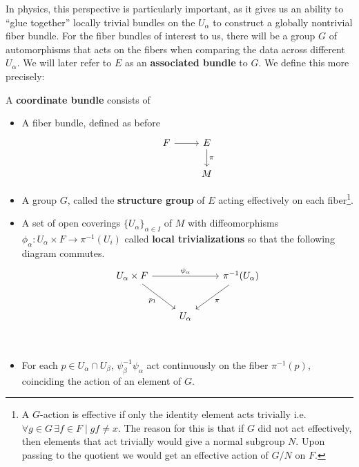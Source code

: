 	In physics, this perspective is particularly important, as it gives us an ability to ``glue together'' locally trivial bundles on the $U_\alpha$ to construct a globally nontrivial fiber bundle. For the fiber bundles of interest to us, there will be a group $G$ of automorphisms that acts on the fibers when comparing the data across different $U_\alpha$. We will later refer to $E$ as an \textbf{associated bundle} to $G$.
	We define this more precisely:
	\begin{defn}
		A \textbf{coordinate bundle} consists of 
		\begin{itemize}
			\item A fiber bundle, defined as before
			\[
			\begin{tikzcd}
				F \arrow[r] & E  \arrow[d,"\pi"] \\ 
				& M
			\end{tikzcd}
			\]
			\item A group $G$, called the \textbf{structure group} of $E$ acting effectively on each fiber\footnote{A $G$-action is effective if only the identity element acts trivially i.e. $\forall g\in G \, \exists f \in F \mid gf \neq x$. The reason for this is that if $G$ did not act effectively, then elements that act trivially would give a normal subgroup $N$. Upon passing to the quotient we would get an effective action of $G/N$ on $F$.}.
			\item A set of open coverings $\{ U_\alpha \}_{\alpha \in I}$ of $M$ with diffeomorphisms $\phi_\alpha: U_\alpha \times F \rightarrow \pi^{-1} (U_i)$ called \textbf{local trivializations} so that the following diagram commutes. 
			\[
			\begin{tikzcd}[row sep=2.5em]
			U_\alpha \times F \arrow[dr,swap,"p_1"] \arrow{rr}{\psi_\alpha} && \pi^{-1}(U_\alpha) \arrow{dl}{\pi} \\
			 & U_\alpha \\
			\end{tikzcd}
			\]
			\item For each $p \in U_\alpha \cap U_\beta$, $\psi_\beta^{-1} \psi_\alpha$ act continuously on the fiber $\pi^{-1}(p)$, coinciding the action of an element of $G$.
		\end{itemize}
		
	\end{defn}
		
